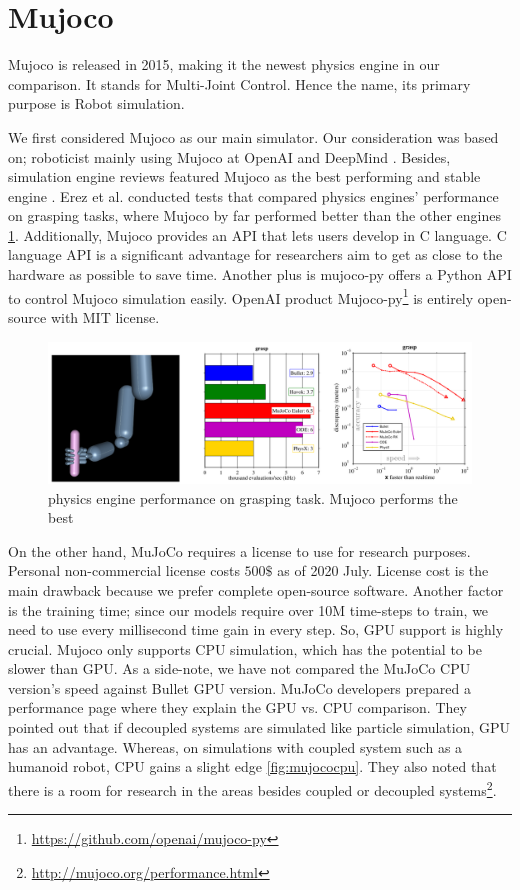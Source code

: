 \section{Mujoco}

Mujoco is released in 2015, making it the newest physics engine in our comparison. It stands for Multi-Joint Control. Hence the name, its primary purpose is Robot simulation.
 
We first considered Mujoco as our main simulator. Our consideration was based on; roboticist mainly using Mujoco at OpenAI and DeepMind \cite{OpenAIgym}. Besides, simulation engine reviews featured Mujoco as the best performing and stable engine \cite{Erez2015}. Erez et al. conducted tests that compared physics engines' performance on grasping tasks, where Mujoco by far performed better than the other engines \ref{fig:handmujoco}. Additionally, Mujoco provides an API that lets users develop in C language. C language API is a significant advantage for researchers aim to get as close to the hardware as possible to save time. Another plus is mujoco-py offers a Python API to control Mujoco simulation easily. OpenAI product Mujoco-py\footnote{\url{https://github.com/openai/mujoco-py}} is entirely open-source with MIT license. 

\begin{figure}[htbp]
    \centering
      \includegraphics[width=1.0\textwidth]{figures/MujocoHand}
    \caption{physics engine performance on grasping task. Mujoco performs the best \cite{Erez2015}}
    \label{fig:handmujoco}
\end{figure}


On the other hand, MuJoCo requires a license to use for research purposes. Personal non-commercial license costs \(500\$\) as of 2020 July. License cost is the main drawback because we prefer complete open-source software. Another factor is the training time; since our models require over 10M time-steps to train, we need to use every millisecond time gain in every step. So, GPU support is highly crucial. Mujoco only supports CPU simulation, which has the potential to be slower than GPU. As a side-note, we have not compared the MuJoCo CPU version's speed against Bullet GPU version. MuJoCo developers prepared a performance page where they explain the GPU vs. CPU comparison. They pointed out that if decoupled systems are simulated like particle simulation, GPU has an advantage. Whereas, on simulations with coupled system such as a humanoid robot, CPU gains a slight edge \ref{fig:mujococpu}. They also noted that there is a room for research in the areas besides coupled or decoupled systems\footnote{\url{http://mujoco.org/performance.html}}.

